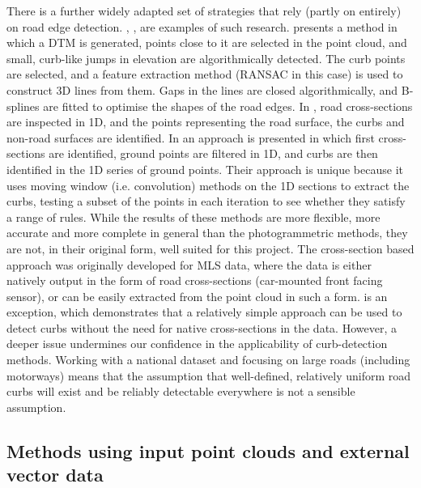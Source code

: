 There is a further widely adapted set of strategies that rely (partly on entirely) on road edge detection. \cite{vosselman_zhou_2009}, \cite{zhang_2010}, \cite{yang_etal_2013} are examples of such research. \cite{vosselman_zhou_2009} presents a method in which a DTM is generated, points close to it are selected in the point cloud, and small, curb-like jumps in elevation are algorithmically detected. The curb points are selected, and a feature extraction method (RANSAC in this case) is used to construct 3D lines from them. Gaps in the lines are closed algorithmically, and B-splines are fitted to optimise the shapes of the road edges. In \cite{zhang_2010}, road cross-sections are inspected in 1D, and the points representing the road surface, the curbs and non-road surfaces are identified. In \cite{yang_etal_2013} an approach is presented in which first cross-sections are identified, ground points are filtered in 1D, and curbs are then identified in the 1D series of ground points. Their approach is unique because it uses moving window (i.e. convolution) methods on the 1D sections to extract the curbs, testing a subset of the points in each iteration to see whether they satisfy a range of rules. While the results of these methods are more flexible, more accurate and more complete in general than the photogrammetric methods, they are not, in their original form, well suited for this project. The cross-section based approach was originally developed for MLS data, where the data is either natively output in the form of road cross-sections (car-mounted front facing sensor), or can be easily extracted from the point cloud in such a form. \cite{vosselman_zhou_2009} is an exception, which demonstrates that a relatively simple approach can be used to detect curbs without the need for native cross-sections in the data. However, a deeper issue undermines our confidence in the applicability of curb-detection methods. Working with a national dataset and focusing on large roads (including motorways) means that the assumption that well-defined, relatively uniform road curbs will exist and be reliably detectable everywhere is not a sensible assumption.

\subsection*{Methods using input point clouds and external vector data}
\label{subsection:roadidentificatiovectordata}


